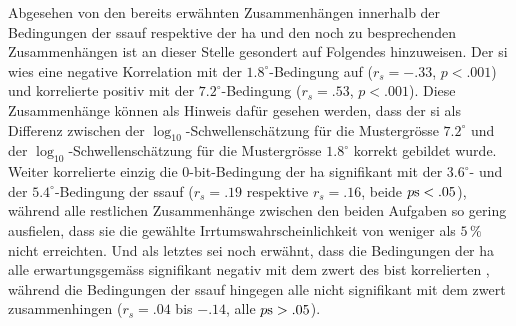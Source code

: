 \documentclass[11pt, twoside, a4paper]{book}		%
\begin{document}
Abgesehen von den bereits erwähnten Zusammenhängen innerhalb der Bedingungen der \gls{ssauf} respektive der \gls{ha} und den noch zu besprechenden Zusammenhängen ist an dieser Stelle gesondert auf Folgendes hinzuweisen.
Der \gls{si} wies eine negative Korrelation mit der $1.8^{\circ}$-Be\-ding\-ung auf ($r_{s}=-.33$, $p<.001$) und korrelierte positiv mit der $7.2^{\circ}$-Bedingung ($r_{s}=.53$, $p<.001$). 
Diese Zusammenhänge können als Hinweis dafür gesehen werden, dass der \gls{si} als Differenz zwischen der $\log_{10}$-Schwel\-len\-schätz\-ung für die Mustergrösse $7.2^{\circ}$ und der $\log_{10}$-Schwel\-len\-schätz\-ung für die Mustergrösse $1.8^{\circ}$ korrekt gebildet wurde.
Weiter korrelierte einzig die 0-bit-Bedingung der \gls{ha} signifikant mit der $3.6^{\circ}$- und der $5.4^{\circ}$-Bedingung der \gls{ssauf}  ($r_{s}=.19$ respektive $r_{s}=.16$, beide $p\textnormal{s}<.05$), während alle restlichen Zusammenhänge zwischen den beiden Aufgaben so gering ausfielen, dass sie die gewählte Irrtumswahrscheinlichkeit von weniger als $5\,\%$ nicht erreichten.
Und als letztes sei noch erwähnt, dass die Bedingungen der \gls{ha} alle erwartungsgemäss  signifikant negativ mit dem \gls{zwert} des \gls{bist} korrelierten \citep[$r_{s}=-.15$ bis $-.32$, alle $p\textnormal{s}<.05$; vgl. ][]{Sheppard2008}, während die Bedingungen der \gls{ssauf} hingegen alle nicht signifikant mit dem \gls{zwert} zusammenhingen ($r_{s}=.04$ bis $-.14$, alle $p\textnormal{s}>.05$).
\end{document}
